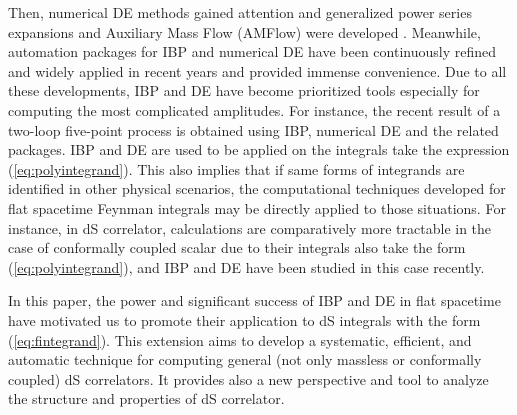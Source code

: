 \documentclass[a4paper,11pt]{article}
\def\eqref#1{(\ref{#1})}
\begin{document}
Then, numerical DE methods  gained attention and generalized power series expansions  \cite{Moriello:2019yhu,Bonciani:2019jyb,Frellesvig:2019byn} 
 and  Auxiliary Mass Flow (AMFlow) were developed \cite{Liu:2022mfb,Liu:2020kpc,Liu:2022tji,Liu:2017jxz} . Meanwhile, automation packages for IBP \cite{Smirnov:2019qkx,vonManteuffel:2012np,Lee:2012cn,Klappert:2020nbg,Peraro:2019svx,Wu:2023upw}  and numerical DE \cite{Liu:2022chg,Hidding:2020ytt,Armadillo:2022ugh}  have been continuously refined and widely applied  in recent years and provided immense convenience. 
Due to all these developments, IBP and DE have become prioritized tools especially for computing the most complicated amplitudes.  For instance, the recent result of a two-loop five-point process  \cite{FebresCordero:2023gjh} is obtained using IBP, numerical DE and the related packages. IBP and DE are used to be applied on the  integrals take the expression \eqref{eq:polyintegrand}. This also implies that if same forms of integrands are identified in other physical scenarios, the computational techniques developed for flat spacetime Feynman integrals may be directly applied to those situations. For instance, in dS correlator, calculations are comparatively more tractable  in the case of conformally coupled scalar due to their integrals also take the form \eqref{eq:polyintegrand}, and IBP and DE have been studied \cite{De:2023xue,Arkani-Hamed:2023kig} in this case  recently.

In this paper, the power and significant success of IBP and DE in flat spacetime  have motivated us to promote their application to dS integrals with the form \eqref{eq:fintegrand}. This extension aims to develop a systematic, efficient, and automatic technique for computing general (not only massless or conformally coupled) dS correlators. It provides also a new perspective and tool to analyze the structure and properties of dS correlator.
\end{document}
